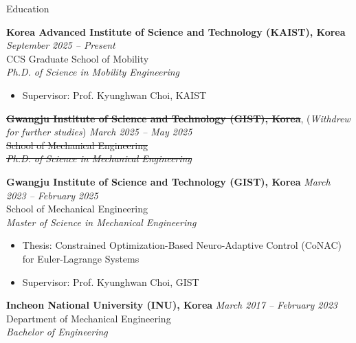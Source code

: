 \documentclass{resume} %
\begin{document}
\begin{rSection}{Education}

\small{
    {\bf Korea Advanced Institute of Science and Technology (KAIST), Korea}
        \hfill 
        {\em September 2025 – Present} 
        \\
        CCS Graduate School of Mobility
        \\
        {\textit {Ph.D. of Science in Mobility Engineering}} 
        \vspace{-.5em}
        \begin{itemize}
            \item Supervisor: Prof. Kyunghwan Choi, KAIST
        \end{itemize}

    \sout{\bf{Gwangju Institute of Science and Technology (GIST), Korea}}, (\textit{Withdrew for further studies})
        \hfill 
        {\em March 2025 – May 2025} 
        \\
        \sout{School of Mechanical Engineering}
        \\
        \sout{\textit {Ph.D. of Science in Mechanical Engineering}} 

    {\bf Gwangju Institute of Science and Technology (GIST), Korea} 
        \hfill 
        {\em March 2023 – February 2025} 
        \\
        School of Mechanical Engineering
        \\
        {\textit {Master of Science in Mechanical Engineering}} 
        \vspace{-.5em}
        \begin{itemize}
            \item Thesis: Constrained Optimization-Based Neuro-Adaptive Control (CoNAC) for Euler-Lagrange Systems
            \vspace{-.75em}
            \item Supervisor: Prof. Kyunghwan Choi, GIST
        \end{itemize}

    {\bf Incheon National University (INU), Korea} 
        \hfill 
        {\em March 2017 – February 2023} 
        \\
        Department of Mechanical Engineering
        \\
        {\textit {Bachelor of Engineering}} 
}


\end{rSection}
\end{document}
